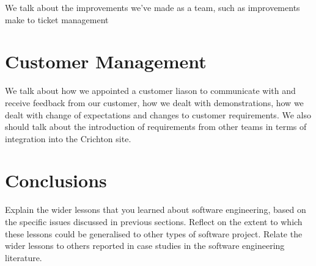 \documentclass{l3proj}
\begin{document}
We talk about the improvements we've made as a team, such as improvements make to ticket management


\section{Customer Management}
\label{sec:managing}

We talk about how we appointed a customer liason to communicate with and receive feedback from our customer, how we dealt with
demonstrations, how we dealt with change of expectations and changes to customer requirements. We also should talk about the
introduction of requirements from other teams in terms of integration into the Crichton site.


\section{Conclusions}

Explain the wider lessons that you learned about software engineering,
based on the specific issues discussed in previous sections.  Reflect
on the extent to which these lessons could be generalised to other
types of software project.  Relate the wider lessons to others
reported in case studies in the software engineering literature.



\end{document}

